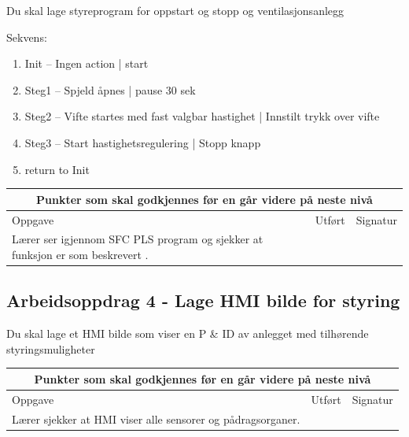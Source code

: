 Du skal lage styreprogram for oppstart og stopp og ventilasjonsanlegg

Sekvens:
\begin{enumerate}
\item Init -- Ingen action |  start
\item Steg1 -- Spjeld åpnes | pause 30 sek
\item Steg2 -- Vifte startes med fast valgbar hastighet | Innstilt trykk over vifte
\item Steg3 --  Start hastighetsregulering | Stopp knapp
\item return to Init
\end{enumerate}

\vskip 5pt 

\begin{center}
\begin{tabular}{ | m{8cm} | m{1cm}| m{2cm} | } 
\hline
\multicolumn{3}{|c|}{Punkter som skal godkjennes før en går videre på neste nivå} \\
	\hline
	Oppgave	& Utført & Signatur \\ 
	\hline
Lærer ser igjennom SFC PLS program og sjekker at funksjon er som beskrevert . & & \\ 
	\hline
\end{tabular}
\end{center}
\newpage
\subsection*{Arbeidsoppdrag 4 - Lage HMI bilde for styring}

Du skal lage et HMI bilde som viser en P \& ID av anlegget med tilhørende
styringsmuligheter


\vskip 5pt 
\begin{center}
\begin{tabular}{ | m{8cm} | m{1cm}| m{2cm} | } 
\hline
\multicolumn{3}{|c|}{Punkter som skal godkjennes før en går videre på neste nivå} \\
	\hline
	Oppgave	& Utført & Signatur \\ 
	\hline
Lærer sjekker at HMI viser alle sensorer og pådragsorganer.& & \\ 
	\hline
\end{tabular}
\end{center}




